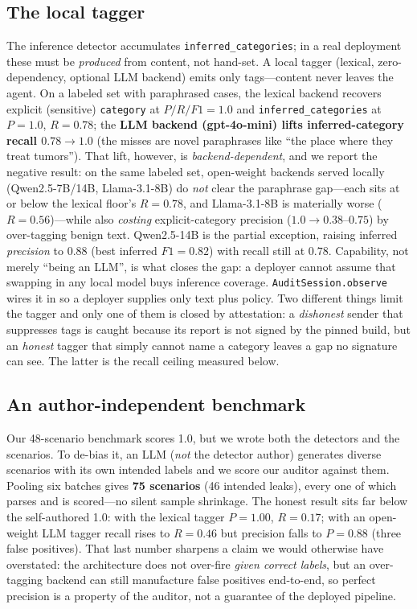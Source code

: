\documentclass[sigconf,anonymous,review]{acmart}
\theoremstyle{acmplain}
\begin{document}
\subsection{The local tagger}
The inference
detector accumulates \texttt{inferred\_categories}; in a real deployment these
must be \emph{produced} from content, not hand-set. A local tagger (lexical,
zero-dependency, optional LLM backend) emits only tags---content never leaves the
agent. On a labeled set with paraphrased cases, the lexical backend recovers explicit
(sensitive) \texttt{category} at $P/R/F1=1.0$ and \texttt{inferred\_categories}
at $P=1.0$, $R=0.78$; the \textbf{LLM backend (gpt-4o-mini) lifts inferred-category
recall $0.78\to1.0$} (the misses are novel paraphrases like ``the place where they
treat tumors'').
That lift, however, is \emph{backend-dependent}, and we report the negative result:
on the same labeled set, open-weight backends served locally (Qwen2.5-7B/14B,
Llama-3.1-8B) do \emph{not} clear the paraphrase gap---each sits at or below the
lexical floor's $R{=}0.78$, and Llama-3.1-8B is materially worse ($R{=}0.56$)---while
also \emph{costing} explicit-category precision ($1.0\to0.38$--$0.75$) by over-tagging
benign text. Qwen2.5-14B is the partial exception, raising inferred \emph{precision}
to $0.88$ (best inferred $F1{=}0.82$) with recall still at $0.78$. Capability, not
merely ``being an LLM'', is what closes the gap: a deployer cannot assume that
swapping in any local model buys inference coverage.
\texttt{AuditSession.observe} wires it in so a deployer supplies only text plus
policy. Two different things limit the tagger and only one of them is closed by
attestation: a \emph{dishonest} sender that suppresses tags is caught because its
report is not signed by the pinned build, but an \emph{honest} tagger that simply
cannot name a category leaves a gap no signature can see. The latter is the recall
ceiling measured below.

\subsection{An author-independent benchmark}
Our 48-scenario benchmark scores 1.0, but we wrote both the detectors and the
scenarios. To de-bias it, an LLM (\emph{not} the detector author) generates diverse
scenarios with its own intended labels and we score our auditor against them. Pooling
six batches gives \textbf{75 scenarios} (46 intended leaks), every one of which parses
and is scored---no silent sample shrinkage. The honest result sits far below the
self-authored 1.0: with the lexical tagger $P{=}1.00$, $R{=}0.17$; with an open-weight
LLM tagger recall rises to $R{=}0.46$ but precision falls to $P{=}0.88$ (three false
positives). That last number sharpens a claim we would otherwise have overstated: the
architecture does not over-fire \emph{given correct labels}, but an over-tagging
backend can still manufacture false positives end-to-end, so perfect precision is a
property of the auditor, not a guarantee of the deployed pipeline.
\end{document}
